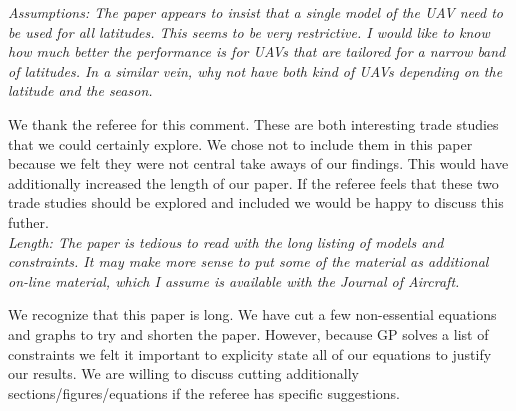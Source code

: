 \documentclass[10pt, a4paper]{article}
\begin{document}
\emph{Assumptions:
The paper appears to insist that a single model of the UAV need to be used for all latitudes. This seems to be very restrictive. I would like to know how much better the performance is for UAVs that are tailored for a narrow band of latitudes.
In a similar vein, why not have both kind of UAVs depending on the latitude and the season.
}

We thank the referee for this comment.  These are both interesting trade studies that we could certainly explore.  We chose not to include them in this paper because we felt they were not central take aways of our findings.  This would have additionally increased the length of our paper.  If the referee feels that these two trade studies should be explored and included we would be happy to discuss this futher. \\

\emph{Length: The paper is tedious to read with the long listing of models and constraints. It may make more sense to put some of the material as additional on-line material, which I assume is available with the Journal of Aircraft.}

We recognize that this paper is long.  
We have cut a few non-essential equations and graphs to try and shorten the paper.  
However, because GP solves a list of constraints we felt it important to explicity state all of our equations to justify our results.  
We are willing to discuss cutting additionally sections/figures/equations if the referee has specific suggestions. \\
\end{document}
